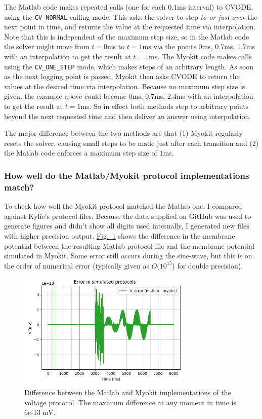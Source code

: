 \documentclass[preprint,authoryear,10pt]{elsarticle}
\newcommand\Fig[2][]{\hyperref[fig:#2]{Fig.~\ref*{fig:#2}\ifstrempty{#1}{}{.#1}}}
\newcommand{\code}[1]{\texttt{#1}}
\begin{document}
The Matlab code makes repeated calls (one for each $0.1$ms interval) to CVODE,
 using the \code{CV\_NORMAL} calling mode.
This asks the solver to step \emph{to or just over} the next point in time, and
 returns the value at the requested time via interpolation.
Note that this is independent of the maximum step size, so in the Matlab code
 the solver might move from $t=0$ms to $t=1$ms via the points $0$ms, $0.7$ms,
 $1.7$ms with an interpolation to get the result at $t=1$ms.
The Myokit code makes calls using the \code{CV\_ONE\_STEP} mode, which makes
 steps of an arbitrary length.
As soon as the next logging point is passed, Myokit then asks CVODE to return
 the values at the desired time via interpolation.
Because no maximum step size is given, the example above could become $0$ms,
 $0.7$ms, $2.4$ms with an interpolation to get the result at $t=1$ms.
So in effect both methods step to arbitrary points beyond the next requested
 time and then deliver an answer using interpolation.

The major difference between the two methods are that (1) Myokit regularly
 resets the solver, causing small steps to be made just after each transition
 and (2) the Matlab code enforces a maximum step size of $1$ms.

\subsubsection{How well do the Matlab/Myokit protocol implementations match?}

To check how well the Myokit protocol matched the Matlab one, I compared
 against Kylie's protocol files.
Because the data supplied on GitHub was used to generate figures and didn't
 show all digits used internally, I generated new files with higher precision
 output.
\Fig{sine-wave-protocol-error} shows the difference in the membrane potential
 between the resulting Matlab protocol file and the membrane potential
 simulated in Myokit.
Some error still occurs during the sine-wave, but this is on the order of
 numerical error (typically given as $O(10^{15}$) for double precision).

\begin{figure}[H]
\centerline{
\includegraphics[width=0.75\textwidth]{fig/sine-wave-protocol-error}
}
\caption{%
Difference between the Matlab and Myokit implementations of the voltage
 protocol.
The maximum difference at any moment in time is 6e-13 mV.
}
\label{fig:sine-wave-protocol-error}
\end{figure}
\end{document}
